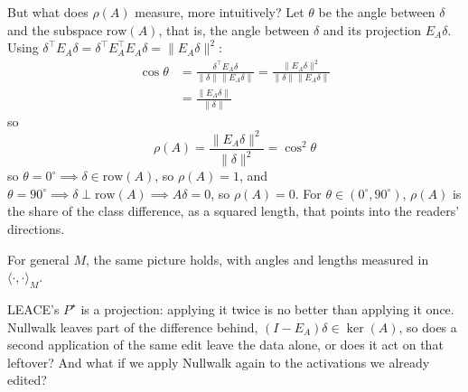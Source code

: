 \documentclass[10pt,a4paper,twocolumn]{article}
\begin{document}
	But what does $\rho(A)$ measure, more intuitively? Let $\theta$ be the angle between $\delta$ and the subspace $\mathrm{row}(A)$, that is, the angle between $\delta$ and its projection $E_A \delta$. Using $\delta^\top E_A \delta = \delta^\top E_A^\top E_A \delta = \| E_A \delta \|^2$:
	$$\begin{aligned}
		\cos \theta & = \frac{\delta^\top E_A \delta}{\| \delta \| \| E_A \delta \|} = \frac{\| E_A \delta \|^2}{\| \delta \| \| E_A \delta \|} \\
		& = \frac{\| E_A \delta \|}{\| \delta \|}
	\end{aligned}$$
	so
	$$\rho(A) = \frac{\| E_A \delta \|^2}{\| \delta \|^2} = \cos^2 \theta$$
	so $\theta = 0^\circ \implies \delta \in \mathrm{row}(A)$, so $\rho(A) = 1$, and $\theta = 90^\circ \implies \delta \perp \mathrm{row}(A) \implies A \delta = 0$, so $\rho(A) = 0$. For $\theta \in (0^\circ, 90^\circ)$, $\rho(A)$ is the share of the class difference, as a squared length, that points into the readers' directions.

	For general $M$, the same picture holds, with angles and lengths measured in $\langle \cdot, \cdot \rangle_M$.

	LEACE's $P^\star$ is a projection: applying it twice is no better than applying it once. Nullwalk leaves part of the difference behind, $(I - E_A) \delta \in \ker(A)$, so does a second application of the same edit leave the data alone, or does it act on that leftover? And what if we apply Nullwalk again to the activations we already edited?
\end{document}
